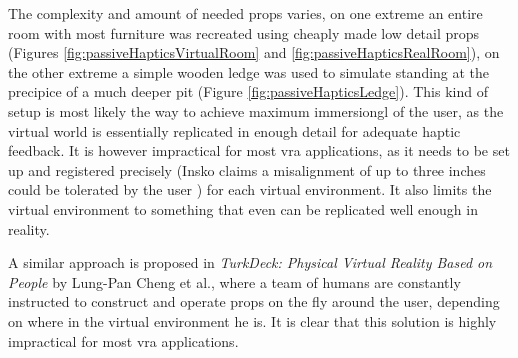 The complexity and amount of needed props varies, on one extreme an entire room with most furniture was recreated using cheaply made low detail props (Figures \autoref{fig:passiveHapticsVirtualRoom} and \autoref{fig:passiveHapticsRealRoom}), on the other extreme a simple wooden ledge was used to simulate standing at the precipice of a much deeper pit (Figure \autoref{fig:passiveHapticsLedge}).
\newline
This kind of setup is most likely the way to achieve maximum \gls{immersiongl} of the user, as the virtual world is essentially replicated in enough detail for adequate haptic feedback. It is however impractical for most \gls{vra} applications, as it needs to be set up and registered precisely (Insko claims a misalignment of up  to three inches could be tolerated by the user \autocite[p. ~63]{passiveHaptics}) for each virtual environment. It also limits the virtual environment to something that even can be replicated well enough in reality.
\newline

A similar approach is proposed in \textit{TurkDeck: Physical Virtual Reality Based on People} \autocite{turkDeck} by Lung-Pan Cheng et al., where a team of humans are constantly instructed to construct and operate props on the fly around the user, depending on where in the virtual environment he is. It is clear that this solution is highly impractical for most \gls{vra} applications.
